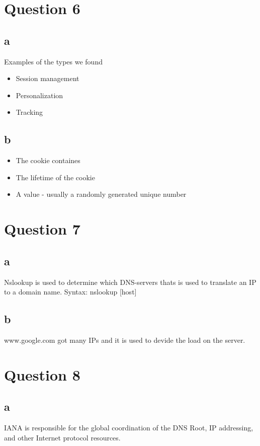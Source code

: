 \documentclass[oneside,a4paper,10pt]{report}
\begin{document}
\newpage



\section{Question 6}
\subsection{a}
Examples of the types we found
\begin{itemize}
  \item Session management
  \item Personalization
  \item Tracking
\end{itemize}
\subsection{b}

\begin{itemize}
  \item The cookie containes
  \item The lifetime of the cookie
  \item A value - usually a randomly generated unique number
\end{itemize}

\section{Question 7}
\subsection{a}
Nslookup is used to determine which DNS-servers thats is used to translate an IP to a domain name.
Syntax: nslookup [host]
\subsection{b}
www.google.com got many IPs and it is used to devide the load on the server.

\section{Question 8}
\subsection{a}
IANA is responsible for the global coordination of the DNS Root, IP addressing, and other Internet protocol resources.
\end{document}
